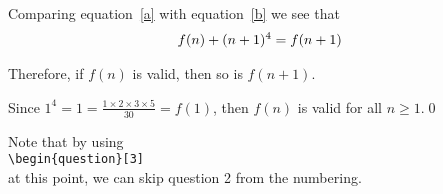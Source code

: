\documentclass[a4paper,12pt]{article}
\begin{document}
\begin{question}
Comparing equation~\eqref{a} with equation~\eqref{b} we see that
\begin{gather}\notag
f(n)+(n+1)^4=f(n+1)
\end{gather}

Therefore, if $f(n)$ is valid, then so is $f(n+1)$.

Since $1^4=1=\frac{1\times2\times3\times5}{30}=f(1)$, then $f(n)$ is valid for all $n\geq1$.\hfill \qed

\end{question} %

\begin{notebox}
\centering
Note that by using\\ \verb|\begin{question}[3]|\\ at this point, we can skip question 2 from the numbering.
\end{notebox}
\end{document}
